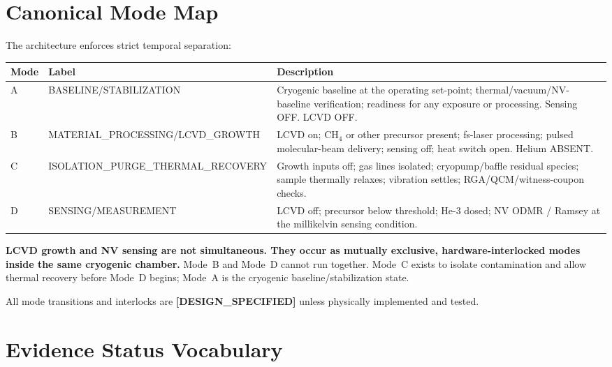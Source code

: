 \documentclass[12pt,a4paper]{article}
\newcommand{\designspec}{\textbf{[DESIGN\_SPECIFIED]}}
\begin{document}
\section{Canonical Mode Map}
\label{sec:modes}

The architecture enforces strict temporal separation:

\begin{center}
\begin{tabular}{llp{8cm}}
\toprule
Mode & Label & Description \\
\midrule
A & BASELINE/STABILIZATION & Cryogenic baseline at the operating set-point; thermal/vacuum/NV-baseline verification; readiness for any exposure or processing. Sensing OFF. LCVD OFF. \\
B & MATERIAL\_PROCESSING/LCVD\_GROWTH & LCVD on; CH$_4$ or other precursor present; fs-laser processing; pulsed molecular-beam delivery; sensing off; heat switch open. Helium ABSENT. \\
C & ISOLATION\_PURGE\_THERMAL\_RECOVERY & Growth inputs off; gas lines isolated; cryopump/baffle residual species; sample thermally relaxes; vibration settles; RGA/QCM/witness-coupon checks. \\
D & SENSING/MEASUREMENT & LCVD off; precursor below threshold; He-3 dosed; NV ODMR / Ramsey at the millikelvin sensing condition. \\
\bottomrule
\end{tabular}
\end{center}

\textbf{LCVD growth and NV sensing are not simultaneous.
They occur as mutually exclusive, hardware-interlocked modes inside the same
cryogenic chamber.}
Mode~B and Mode~D cannot run together.
Mode~C exists to isolate contamination and allow thermal recovery before
Mode~D begins; Mode~A is the cryogenic baseline/stabilization state.

All mode transitions and interlocks are \designspec{} unless physically
implemented and tested.

\section{Evidence Status Vocabulary}
\label{sec:vocab}
\end{document}
